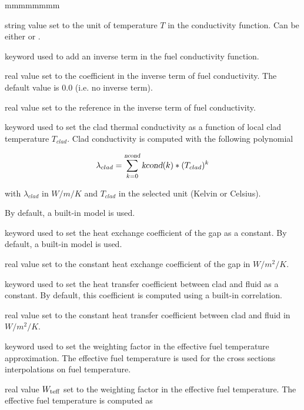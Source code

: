 \begin{ListeDeDescription}{mmmmmmmm}
\item[\dusa{unit}] string value set to the unit of temperature $T$ in the conductivity function. Can be either  or .

\item[\moc{INV}] keyword used to add an inverse term in the fuel conductivity function.

\item[\dusa{inv}] real value set to the coefficient in the inverse term of fuel conductivity.
The default value is 0.0 (i.e. no inverse term).

\item[\dusa{ref}] real value set to the reference in the inverse term of fuel conductivity.

\item[\moc{CONDC}] keyword used to set the clad thermal conductivity as a function of local clad temperature $T_{clad}$.
Clad conductivity is computed with the following polynomial

$$\lambda_{clad} = \sum_{k=0}^{\dusa{ncond}} {\dusa{kcond}(k)*(T_{clad})^k}$$

with $\lambda_{clad}$ in $W/m/K$ and $T_{clad}$ in the selected unit (Kelvin or Celsius).

By default, a built-in model is used.

\item[\moc{HGAP}] keyword used to set the heat exchange coefficient of the gap as a constant.
By default, a built-in model is used.

\item[\dusa{hgap}] real value set to the constant heat exchange coefficient of the gap in $W/m^2/K$.

\item[\moc{HCONV}] keyword used to set the heat transfer coefficient between clad and fluid as a constant.
By default, this coefficient is computed using a built-in correlation.

\item[\dusa{hconv}] real value set to the constant heat transfer coefficient between clad and fluid in $W/m^2/K$.

\item[\moc{TEFF}] keyword used to set the weighting factor in the effective fuel temperature approximation.
The effective fuel temperature is used for the cross sections interpolations on fuel temperature.

\item[\dusa{wteff}] real value $W_{\rm teff}$ set to the weighting factor in the effective fuel temperature.
The effective fuel temperature is computed as


\end{ListeDeDescription}
